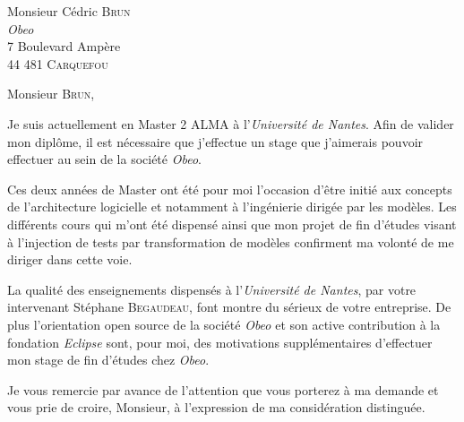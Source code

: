 \documentclass{lettre}
\makeatletter
\newcommand*{\NoRule}{\renewcommand*{\rule@length}{0}}
\makeatother
\begin{document}
 
\begin{letter}{Monsieur Cédric \textsc{Brun}\\
\emph{Obeo}\\7 Boulevard Ampère\\44 481 \textsc{Carquefou}
 }
\francais
\pagestyle{headings}

\renewcommand{\vrefname}{\hspace{-2.4cm}\small Réf. :~\No~\'Etudiant~} %
\renewcommand{\nrefname}{} %

\signature{Romain \textsc{Rincé}}
\address{Romain \textsc{Rincé}\\5 Place du Bouffay\\44000 \textsc{Nantes}}

\nofax
\NoRule
\def\concname{\hspace{-2.4cm}\small Objet :~} %
\opening{Monsieur \textsc{Brun},}
 \vspace{0.5cm}
 Je suis actuellement en Master 2 \textsc{ALMA} à l'\emph{Université de Nantes}. Afin de valider mon diplôme, il est nécessaire que j'effectue un stage que j'aimerais pouvoir effectuer au sein de la société \emph{Obeo}.
 
 Ces deux années de Master ont été pour moi l'occasion d'être initié aux concepts de l'architecture logicielle et notamment à l'ingénierie dirigée par les modèles. Les différents cours qui m'ont été dispensé ainsi que mon projet de fin d'études visant à l'injection de tests par transformation de modèles confirment ma volonté de me diriger dans cette voie.
 
 La qualité des enseignements dispensés à  l'\emph{Université de Nantes}, par votre intervenant Stéphane \textsc{Begaudeau}, font montre du sérieux de votre entreprise. De plus l'orientation open source de la société \emph{Obeo} et son active contribution à la fondation \emph{Eclipse} sont, pour moi, des motivations supplémentaires d'effectuer mon stage de fin d'études chez \emph{Obeo}. 
  
 \closing{Je vous remercie par avance de l’attention que vous porterez à ma demande et vous prie de
croire, Monsieur, à l’expression de ma considération distinguée.}

 
\end{letter}
 
\end{document}
